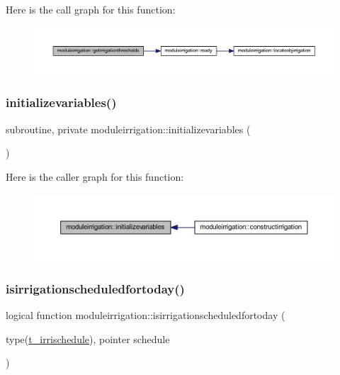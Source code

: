 Here is the call graph for this function\+:\nopagebreak
\begin{figure}[H]
\begin{center}
\leavevmode
\includegraphics[width=350pt]{namespacemoduleirrigation_a64c49f7b68195826fe0693bf10d5cc26_cgraph}
\end{center}
\end{figure}
\mbox{\label{namespacemoduleirrigation_ae48537ba7c81436db04d271739290617}} 
\subsubsection{\texorpdfstring{initializevariables()}{initializevariables()}}
{\footnotesize\ttfamily subroutine, private moduleirrigation\+::initializevariables (\begin{DoxyParamCaption}{ }\end{DoxyParamCaption})\hspace{0.3cm}{\ttfamily [private]}}

Here is the caller graph for this function\+:\nopagebreak
\begin{figure}[H]
\begin{center}
\leavevmode
\includegraphics[width=350pt]{namespacemoduleirrigation_ae48537ba7c81436db04d271739290617_icgraph}
\end{center}
\end{figure}
\mbox{\label{namespacemoduleirrigation_aac246bcb2688c75d66da1daaa6234e3f}} 
\subsubsection{\texorpdfstring{isirrigationscheduledfortoday()}{isirrigationscheduledfortoday()}}
{\footnotesize\ttfamily logical function moduleirrigation\+::isirrigationscheduledfortoday (\begin{DoxyParamCaption}\item[{type(\mbox{\hyperlink{structmoduleirrigation_1_1t__irrischedule}{t\+\_\+irrischedule}}), pointer}]{schedule }\end{DoxyParamCaption})\hspace{0.3cm}{\ttfamily [private]}}

